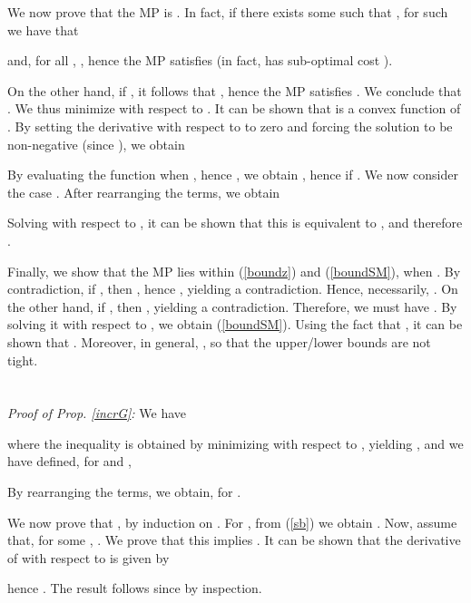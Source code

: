 \documentclass[10pt,twocolumn,twoside]{IEEEtran}
\theoremstyle{plain}
\begin{document}
We now prove that the MP is .
In fact, if there exists some  such that , for such  we have that 

and, for all ,
, 
hence the MP satisfies  (in fact,  has sub-optimal cost ).

On the other hand, if , it follows that
, hence the MP satisfies  .
We conclude that .
We thus minimize  with respect to . It can be shown that  is a convex function of .
By setting the derivative with respect to  to zero and forcing the solution to be non-negative (since ), we obtain

By evaluating the function  when , hence ,
we obtain
, hence  if .
We now consider the case . After rearranging the terms, we obtain

Solving  with respect to , it can be shown that this is equivalent to ,
and therefore .

Finally, we  show that the MP lies within (\ref{boundz}) and (\ref{boundSM}), when .
By contradiction, if ,
then , hence
, yielding a contradiction.
Hence, necessarily,  .
On the other hand, if , then , yielding a contradiction.
Therefore, we must have . By solving it with respect to 
, we obtain (\ref{boundSM}).
Using the fact that , it can be shown  that 
. Moreover, in general, ,
so that
the upper/lower bounds are not tight.
\hfill\QED
\vspace{-3mm}
\section{}
\label{AppincrG}
\noindent\emph{Proof of Prop. \ref{incrG}:}
We have
 
where the inequality is obtained by minimizing with respect to , yielding , and we have defined, for
 and ,

By rearranging the terms, we obtain, for .



We now prove that , by induction on .
For ,  from (\ref{sb}) we obtain .
Now, assume that, for some  , . We prove that this implies .
It can be shown that 
the derivative of  with respect to  is given by

hence .
The result follows since  by inspection.
\hfill\QED


\end{document}
